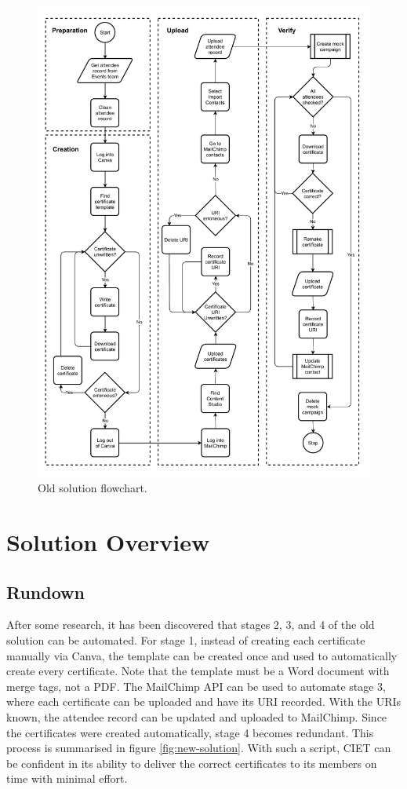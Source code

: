 \documentclass[11pt]{article}
\begin{document}
\begin{figure}[h!]
    \includegraphics[width=\textwidth]{figures/old_solution.pdf}
    \caption{Old solution flowchart.}
    \label{fig:old-solution}
\end{figure}

\newpage

\section{Solution Overview}

\subsection{Rundown}

After some research, it has been discovered that stages 2, 3, and 4 of the old solution can be automated. For stage 1, instead of creating each certificate manually via Canva, the template can be created once and used to automatically create every certificate. Note that the template must be a Word document with merge tags, not a PDF. The MailChimp API can be used to automate stage 3, where each certificate can be uploaded and have its URI recorded. With the URIs known, the attendee record can be updated and uploaded to MailChimp. Since the certificates were created automatically, stage 4 becomes redundant. This process is summarised in figure \ref{fig:new-solution}. With such a script, CIET can be confident in its ability to deliver the correct certificates to its members on time with minimal effort.
\end{document}
